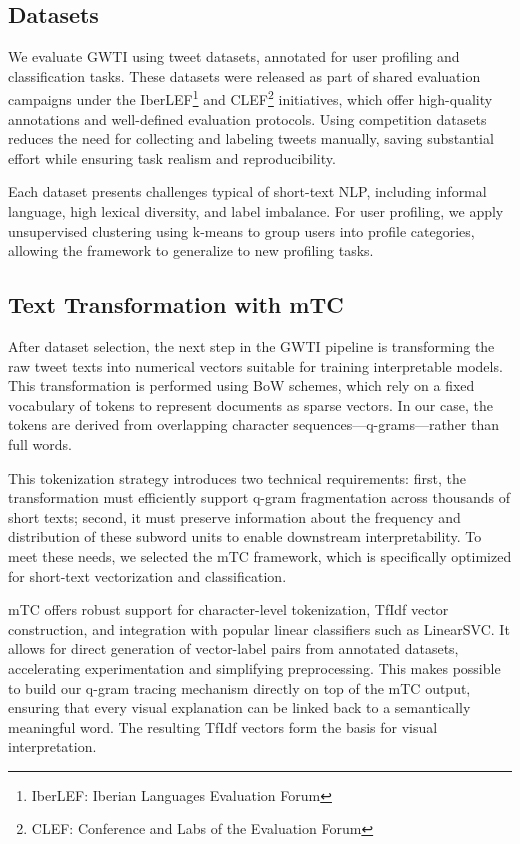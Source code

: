 \documentclass[runningheads,10pt]{llncs}
\begin{document}
\subsection{Datasets}

We evaluate \ac{GWTI} using tweet datasets, annotated for user profiling and classification tasks. These datasets were released as part of shared evaluation campaigns under the IberLEF\footnote{IberLEF: Iberian Languages Evaluation Forum} and CLEF\footnote{CLEF: Conference and Labs of the Evaluation Forum} initiatives, which offer high-quality annotations and well-defined evaluation protocols. Using competition datasets reduces the need for collecting and labeling tweets manually, saving substantial effort while ensuring task realism and reproducibility.

Each dataset presents challenges typical of short-text \ac{NLP}, including informal language, high lexical diversity, and label imbalance. For user profiling, we apply unsupervised clustering using k-means to group users into profile categories, allowing the framework to generalize to new profiling tasks.

\subsection{Text Transformation with \ac{mTC}}

After dataset selection, the next step in the \ac{GWTI} pipeline is transforming the raw tweet texts into numerical vectors suitable for training interpretable models. This transformation is performed using \ac{BoW} schemes, which rely on a fixed vocabulary of tokens to represent documents as sparse vectors. In our case, the tokens are derived from overlapping character sequences—q-grams—rather than full words.

This tokenization strategy introduces two technical requirements: first, the transformation must efficiently support q-gram fragmentation across thousands of short texts; second, it must preserve information about the frequency and distribution of these subword units to enable downstream interpretability. To meet these needs, we selected the \ac{mTC} framework, which is specifically optimized for short-text vectorization and classification.

\ac{mTC} offers robust support for character-level tokenization, \ac{TfIdf} vector construction, and integration with popular linear classifiers such as \ac{LinearSVC}. It allows for direct generation of vector-label pairs from annotated datasets, accelerating experimentation and simplifying preprocessing. This makes possible to build our q-gram tracing mechanism directly on top of the \ac{mTC} output, ensuring that every visual explanation can be linked back to a semantically meaningful word. The resulting \ac{TfIdf} vectors form the basis for visual interpretation.
\end{document}
